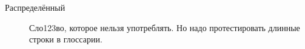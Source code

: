 \Defines %
\begin{description}
\item[Распределённый] Сло123во, которое нельзя употреблять. Но надо протестировать длинные строки в глоссарии.
\end{description}

